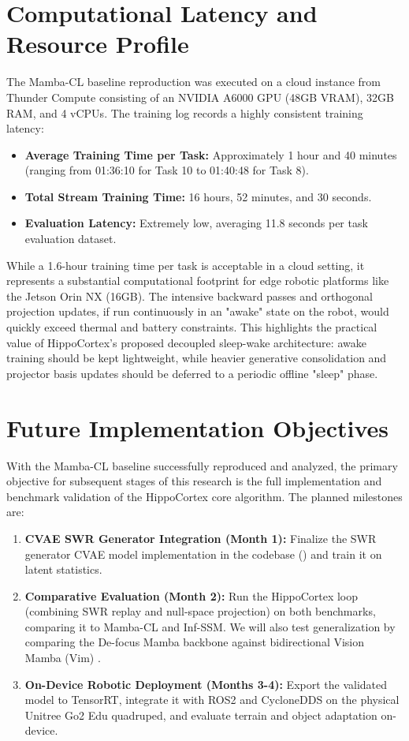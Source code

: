 \section{Computational Latency and Resource Profile}
\label{sec:computational_profile}

The Mamba-CL baseline reproduction was executed on a cloud instance from Thunder Compute consisting of an NVIDIA A6000 GPU (48GB VRAM), 32GB RAM, and 4 vCPUs. The training log records a highly consistent training latency:
\begin{itemize}
    \item \textbf{Average Training Time per Task:} Approximately 1 hour and 40 minutes (ranging from 01:36:10 for Task 10 to 01:40:48 for Task 8).
    \item \textbf{Total Stream Training Time:} 16 hours, 52 minutes, and 30 seconds.
    \item \textbf{Evaluation Latency:} Extremely low, averaging 11.8 seconds per task evaluation dataset.
\end{itemize}

While a 1.6-hour training time per task is acceptable in a cloud setting, it represents a substantial computational footprint for edge robotic platforms like the Jetson Orin NX (16GB). The intensive backward passes and orthogonal projection updates, if run continuously in an "awake" state on the robot, would quickly exceed thermal and battery constraints. This highlights the practical value of HippoCortex's proposed decoupled sleep-wake architecture: awake training should be kept lightweight, while heavier generative consolidation and projector basis updates should be deferred to a periodic offline "sleep" phase.

\section{Future Implementation Objectives}
\label{sec:future_plan}

With the Mamba-CL baseline successfully reproduced and analyzed, the primary objective for subsequent stages of this research is the full implementation and benchmark validation of the HippoCortex core algorithm. The planned milestones are:
\begin{enumerate}
    \item \textbf{CVAE SWR Generator Integration (Month 1):} Finalize the SWR generator CVAE model implementation in the codebase () and train it on latent statistics.
    \item \textbf{Comparative Evaluation (Month 2):} Run the HippoCortex loop (combining SWR replay and null-space projection) on both benchmarks, comparing it to Mamba-CL and Inf-SSM. We will also test generalization by comparing the De-focus Mamba backbone against bidirectional Vision Mamba (Vim) \cite{zhuVisionMambaEfficient2024}.
    \item \textbf{On-Device Robotic Deployment (Months 3-4):} Export the validated model to TensorRT, integrate it with ROS2 and CycloneDDS on the physical Unitree Go2 Edu quadruped, and evaluate terrain and object adaptation on-device.
\end{enumerate}

